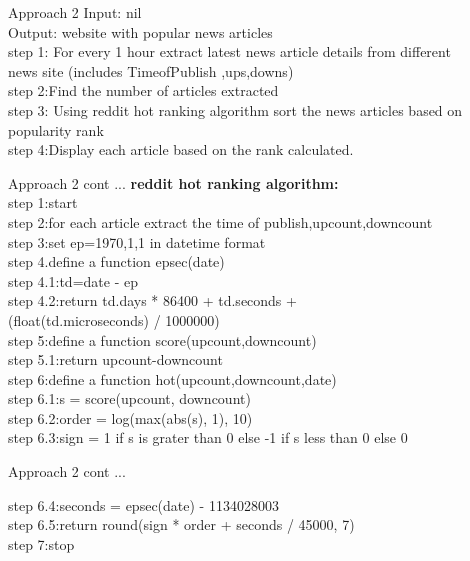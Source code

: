 \documentclass{beamer}
\begin{document}
	\begin{frame}{Approach 2}
	\footnotesize
	Input: nil \\
	Output: website with popular news articles\\
	\vspace{.2cm}
	\footnotesize
	step 1: For every 1 hour extract latest news article details from different\\ \hspace{1.2mm} news site 
	(includes TimeofPublish ,ups,downs)\\
	step 2:Find the number of articles extracted\\
	step 3: Using reddit hot ranking algorithm sort the news articles based on popularity rank\\
	step 4:Display each article based on the rank calculated.\\
	\vspace{0.5cm}
	\end{frame}
	\begin{frame}{Approach 2 cont ...}
	\textbf{reddit hot ranking algorithm:}\\
	step 1:start\\
	step 2:for each article extract the time of publish,upcount,downcount\\
	step 3:set ep=1970,1,1 in datetime format\\
	step 4.define a function epsec(date)\\
	\hspace{.3cm}step 4.1:td=date - ep\\
	\hspace{.3cm}step 4.2:return td.days * 86400 + td.seconds +\\ \hspace{.8cm}(float(td.microseconds) / 1000000)\\
	step 5:define a function score(upcount,downcount)\\
	\hspace{.3cm}step 5.1:return upcount-downcount\\
	step 6:define a function hot(upcount,downcount,date)\\
    \hspace{.3cm}step 6.1:s = score(upcount, downcount)\\
    \hspace{.3cm}step 6.2:order = log(max(abs(s), 1), 10)\\
    \hspace{.3cm}step 6.3:sign = 1 if s is grater than 0 else -1 if s less than 0 else 0\\
    \end{frame}
    \begin{frame}{Approach 2 cont ...}
    
    \hspace{.3cm}step 6.4:seconds = epsec(date) - 1134028003\\
    \hspace{.3cm}step 6.5:return round(sign * order + seconds / 45000, 7)\\
    step 7:stop
    \end{frame}
	
\end{document}
